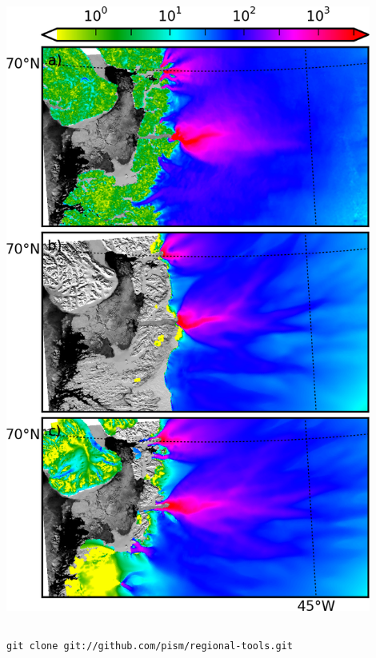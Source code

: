 \documentclass[hide notes,intlimits]{beamer}
\begin{document}
\begin{frame}
\begin{columns}
\begin{column}{0.4\textwidth}
  \includegraphics[width=0.9\textwidth]{jako-grn1km}
\end{column}
\end{columns}

\begin{center}
\scriptsize \texttt{git clone git://github.com/pism/regional-tools.git}
\end{center}
\end{frame}
\end{document}
